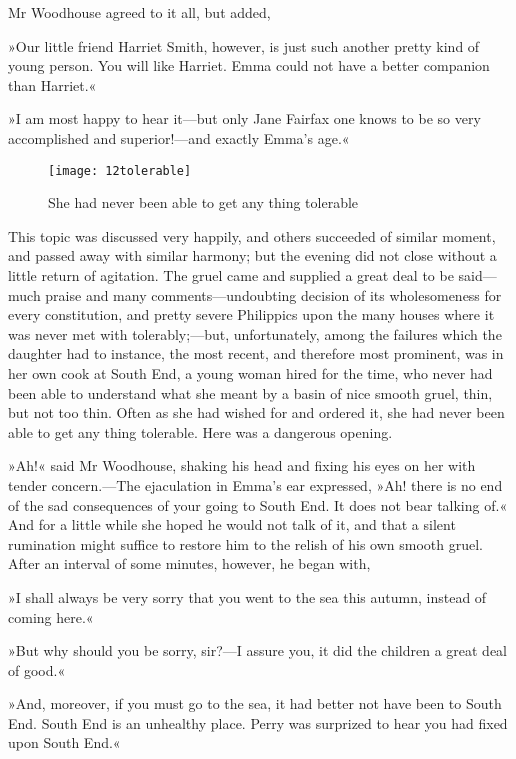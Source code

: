 Mr Woodhouse agreed to it all, but added,

»Our little friend Harriet Smith, however, is just such another pretty kind of young person. You will like Harriet. Emma could not have a better companion than Harriet.«

»I am most happy to hear it—but only Jane Fairfax one knows to be so very accomplished and superior!—and exactly Emma's age.«

\begin{figure}[tbph]
\centering
\texttt{[image: 12tolerable]}
\caption{She had never been able to get any thing tolerable}
\end{figure}

This topic was discussed very happily, and others succeeded of similar moment, and passed away with similar harmony; but the evening did not close without a little return of agitation. The gruel came and supplied a great deal to be said—much praise and many comments—undoubting decision of its wholesomeness for every constitution, and pretty severe Philippics upon the many houses where it was never met with tolerably;—but, unfortunately, among the failures which the daughter had to instance, the most recent, and therefore most prominent, was in her own cook at South End, a young woman hired for the time, who never had been able to understand what she meant by a basin of nice smooth gruel, thin, but not too thin. Often as she had wished for and ordered it, she had never been able to get any thing tolerable. Here was a dangerous opening.

»Ah!« said Mr Woodhouse, shaking his head and fixing his eyes on her with tender concern.—The ejaculation in Emma's ear expressed, »Ah! there is no end of the sad consequences of your going to South End. It does not bear talking of.« And for a little while she hoped he would not talk of it, and that a silent rumination might suffice to restore him to the relish of his own smooth gruel. After an interval of some minutes, however, he began with,

»I shall always be very sorry that you went to the sea this autumn, instead of coming here.«

»But why should you be sorry, sir?—I assure you, it did the children a great deal of good.«

»And, moreover, if you must go to the sea, it had better not have been to South End. South End is an unhealthy place. Perry was surprized to hear you had fixed upon South End.«

